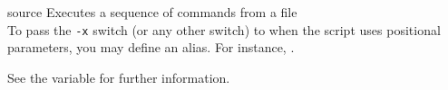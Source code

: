 \begin{nusmvCommand} {source} {Executes a sequence of commands from a file}
 \\
  To pass the \texttt{-x} switch (or any other switch) to  when the
  script uses positional parameters, you may define an alias. For
  instance, .

  See the variable  for further information. 
\end{nusmvCommand}
